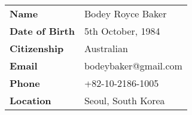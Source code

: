 \documentclass[10pt, a4paper]{report}
\begin{document}
\begin{minipage}{0.2\linewidth}
\begin{tabular}{ll}
{\bf Name} & Bodey Royce Baker \\ 
{\bf Date of Birth} & 5th October, 1984 \\
{\bf Citizenship} & Australian \\
{\bf Email} & bodeybaker@gmail.com \\
{\bf Phone} & {\footnotesize +}82-10-2186-1005 \\
{\bf Location} & Seoul, South Korea \\

\end{tabular}
\end{minipage}
\hfill
\begin{minipage}{0.5\linewidth}
{%


\vspace{0.7em}


}%
\end{minipage}

\vfill
\end{document}
